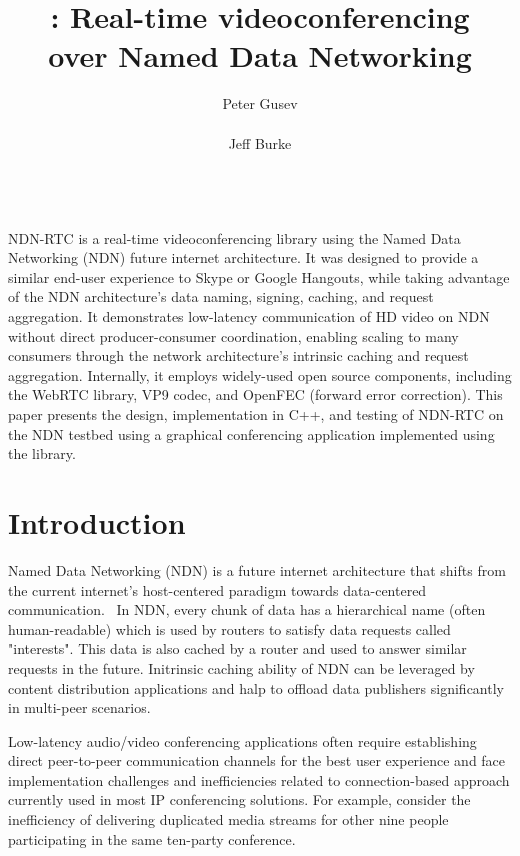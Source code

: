 \documentclass{icn/sig-alternate-2012} %
\title{\ndnrtcName{}: Real-time videoconferencing\\ over Named Data Networking}
\author{
\alignauthor Peter Gusev\\
       \affaddr{UCLA REMAP}\\
       \email{peter@remap.ucla.edu}
\alignauthor Jeff Burke\\
       \affaddr{UCLA REMAP}\\
       \email{jburke@remap.ucla.edu}
}
\newcommand{\ndnrtcName}{NDN-RTC} %
\begin{document}
\maketitle

\abstract
\ndnrtcName{} is a real-time videoconferencing library using the Named Data Networking (NDN) future internet architecture. It was designed to provide a similar end-user experience to Skype or Google Hangouts, while taking advantage of the NDN architecture's data naming, signing, caching, and request aggregation. It demonstrates low-latency communication of HD video on NDN without direct producer-consumer coordination, enabling scaling to many consumers through the network architecture's intrinsic caching and request aggregation. Internally, it employs widely-used open source components, including the WebRTC library, VP9 codec, and OpenFEC (forward error correction). This paper presents the design, implementation in C++, and testing of \ndnrtcName{} on the NDN testbed using a graphical conferencing application implemented using the library.

\section{Introduction}
Named Data Networking (NDN) is a future internet architecture that shifts from the current internet's host-centered paradigm towards data-centered communication.~\cite{ndntechreport} In NDN, every chunk of data has a hierarchical name (often human-readable) which is used by routers to satisfy data requests called "interests". This data is also cached by a router and used to answer similar requests in the future. Initrinsic caching ability of NDN can be leveraged by content distribution applications and halp to offload data publishers significantly in multi-peer scenarios.

Low-latency audio/video conferencing applications often require establishing direct peer-to-peer communication channels for the best user experience and face implementation challenges and inefficiencies related to connection-based approach currently used in most IP conferencing solutions. For example, consider the inefficiency of delivering duplicated media streams for other nine people participating in the same ten-party conference.
\end{document}
